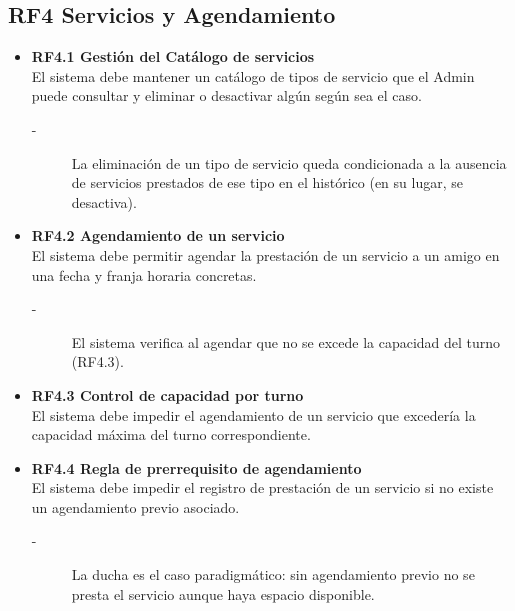 \subsection{RF4 Servicios y Agendamiento}
\begin{itemize}
    \item \textbf{RF4.1 Gestión del Catálogo de servicios} \\
    El sistema debe mantener un catálogo de tipos de servicio que el Admin
    puede consultar y eliminar o desactivar algún según sea el caso.
    \begin{description}
        \item[-] La eliminación de un tipo de servicio queda condicionada a la ausencia
        de servicios prestados de ese tipo en el histórico (en su lugar, se
        desactiva).
    \end{description}

    \item \textbf{RF4.2 Agendamiento de un servicio} \\
    El sistema debe permitir agendar la prestación de un servicio a un amigo en una fecha y franja horaria concretas.
    \begin{description}
        \item[-] El sistema verifica al agendar que no se excede la capacidad del turno (RF4.3).
    \end{description}

    \item \textbf{RF4.3 Control de capacidad por turno} \\
    El sistema debe impedir el agendamiento de un servicio que excedería la
    capacidad máxima del turno correspondiente.
    
    \item \textbf{RF4.4 Regla de prerrequisito de agendamiento} \\
    El sistema debe impedir el registro de prestación de un servicio si no existe un agendamiento previo asociado.
    \begin{description}
        \item[-] La ducha es el caso paradigmático: sin agendamiento previo no se presta el servicio aunque haya espacio disponible.
    \end{description}
    

\end{itemize}
